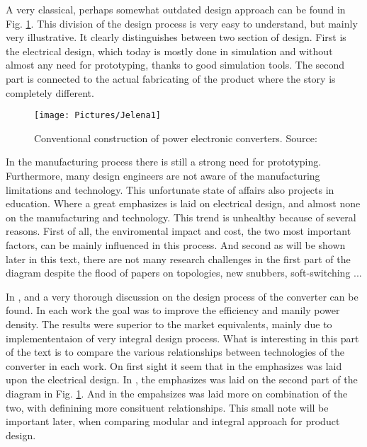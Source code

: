 \documentclass[]{scrartcl}
\begin{document}
A very classical, perhaps somewhat outdated design approach can be found in Fig. \ref{fig:jelena2}. This division of the design process is very easy to understand, but mainly very illustrative. It clearly distinguishes between two section of design. First is the electrical design, which today is mostly done in simulation and without almost any need for prototyping, thanks to good simulation tools. The second part is  connected to the actual fabricating of the product where the story is completely different.

\begin{figure}[h!]
	\centering
	\texttt{[image: Pictures/Jelena1]}
	\caption{Conventional construction of power electronic converters. Source:\cite{Popovic2005}}
	\label{fig:jelena2}
\end{figure}

In the manufacturing process there is still a strong need for prototyping. Furthermore, many design engineers are not aware of the manufacturing limitations and technology. This unfortunate state of affairs also projects in education. Where a great emphasizes is laid on electrical design, and almost none on the manufacturing and technology. This trend is unhealthy because of several reasons. First of all, the enviromental impact and cost, the two most important factors, can be mainly influenced in this process. And second as will be shown later in this text, there are not many research challenges in the first part of the diagram despite the flood of papers on topologies, new snubbers, soft-switching ... 

In \cite{Pavlovsky2006},\cite{Popovic2005} and \cite{Gerber2005} a very thorough discussion on the design process of the converter can be found. In each work the goal was to improve the efficiency and manily power density. The results were superior to the market equivalents, mainly due to implemententaion of very integral design process. What is interesting in this part of the text is to compare the various relationships between technologies of the converter in each work. On first sight it seem that in \cite{Pavlovsky2006} the emphasizes was laid upon the electrical design. In \cite{Popovic2005}, the emphasizes was laid on the second part of the diagram in Fig. \ref{fig:jelena2}. And in \cite{Gerber2005} the empahsizes was laid more on combination of the two, with definining more consituent relationships.  This small note will be important later, when comparing modular and integral approach for product design.
\end{document}
